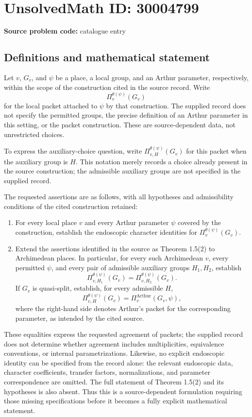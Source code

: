 \documentclass[11pt]{article}
\begin{document}
\section*{UnsolvedMath ID: 30004799}
\textbf{Source problem code:} catalogue entry
\subsection{Definitions and mathematical statement}
Let \(v\), \(G_v\), and \(\psi\) be a place, a local group, and an Arthur parameter, respectively, within the scope of the construction cited in the source record. Write
\[
\Pi^{\theta(\psi)}_v(G_v)
\]
for the local packet attached to \(\psi\) by that construction. The supplied record does not specify the permitted groups, the precise definition of an Arthur parameter in this setting, or the packet construction. These are source-dependent data, not unrestricted choices.

To express the auxiliary-choice question, write \(\Pi^{\theta(\psi)}_{v,H}(G_v)\) for this packet when the auxiliary group is \(H\). This notation merely records a choice already present in the source construction; the admissible auxiliary groups are not specified in the supplied record.

The requested assertions are as follows, with all hypotheses and admissibility conditions of the cited construction retained:
\begin{enumerate}
\item For every local place \(v\) and every Arthur parameter \(\psi\) covered by the construction, establish the endoscopic character identities for \(\Pi^{\theta(\psi)}_v(G_v)\).
\item Extend the assertions identified in the source as Theorem 1.5(2) to Archimedean places. In particular, for every such Archimedean \(v\), every permitted \(\psi\), and every pair of admissible auxiliary groups \(H_1,H_2\), establish
\[
\Pi^{\theta(\psi)}_{v,H_1}(G_v)
=
\Pi^{\theta(\psi)}_{v,H_2}(G_v).
\]
If \(G_v\) is quasi-split, establish, for every admissible \(H\),
\[
\Pi^{\theta(\psi)}_{v,H}(G_v)
=
\Pi^{\mathrm{Arthur}}_v(G_v,\psi),
\]
where the right-hand side denotes Arthur's packet for the corresponding parameter, as intended by the cited source.
\end{enumerate}

These equalities express the requested agreement of packets; the supplied record does not determine whether agreement includes multiplicities, equivalence conventions, or internal parametrizations. Likewise, no explicit endoscopic identity can be specified from the record alone: the relevant endoscopic data, character coefficients, transfer factors, normalizations, and parameter correspondence are omitted. The full statement of Theorem 1.5(2) and its hypotheses is also absent. Thus this is a source-dependent formulation requiring those missing specifications before it becomes a fully explicit mathematical statement.
\end{document}
